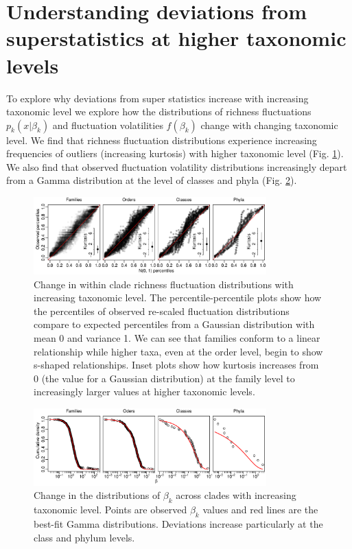 \documentclass[12pt]{article}
\begin{document}
\section{Understanding deviations from superstatistics at higher
  taxonomic levels}
\label{sec:suppSstatTaxLevels}

To explore why deviations from super statistics increase with
increasing taxonomic level we explore how the distributions of
richness fluctuations $p_k(x | \beta_k)$ and fluctuation volatilities
$f(\beta_k)$ change with changing taxonomic level. We find that
richness fluctuation distributions experience increasing frequencies
of outliers (increasing kurtosis) with higher taxonomic level
(Fig. \ref{figSupp:pkx_allTaxa}). We also find that observed
fluctuation volatility distributions increasingly depart from a Gamma
distribution at the level of classes and phyla
(Fig. \ref{figSupp:fbeta_allTaxa}).

\begin{figure}[!hp]
  \centering
  \includegraphics[width=0.8\textwidth]{../../figSupp_pkx_allTaxa.pdf}
  \caption{Change in within clade richness fluctuation distributions
    with increasing taxonomic level. The percentile-percentile plots
    show how the percentiles of observed re-scaled fluctuation
    distributions compare to expected percentiles from a Gaussian
    distribution with mean 0 and variance 1. We can see that families
    conform to a linear relationship while higher taxa, even at the
    order level, begin to show s-shaped relationships. Inset plots
    show how kurtosis increases from 0 (the value for a Gaussian
    distribution) at the family level to increasingly larger values
    at higher taxonomic levels.}
  \label{figSupp:pkx_allTaxa}
\end{figure}

\begin{figure}[!hp]
  \centering
  \includegraphics[width=0.8\textwidth]{../../figSupp_fbeta_allTaxa.pdf}
  \caption{Change in the distributions of $\beta_k$ across clades with
    increasing taxonomic level. Points are observed $\beta_k$ values
    and red lines are the best-fit Gamma distributions. Deviations
    increase particularly at the class and phylum levels.}
  \label{figSupp:fbeta_allTaxa}
\end{figure}
\end{document}
